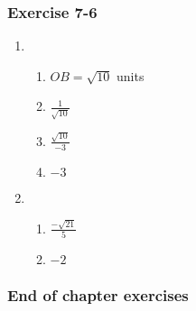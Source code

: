 {\begin{multicols}{3}
\subsubsection*{Exercise 7-6} %
  \begin{enumerate}[noitemsep, label=\textbf{\arabic*}. ]
   \item %
\begin{enumerate}[itemsep=1pt, label=\textbf{(\alph*)} ]
\item $OB=\sqrt{10}$ units%
\item $\frac{1}{\sqrt{10}}$%
\item $\frac{\sqrt{10}}{-3}$%
\item $-3$%
\end{enumerate}


\item %

\begin{enumerate}[itemsep=1pt, label=\textbf{(\alph*)} ]
\item $\frac{-\sqrt{21}}{5}$%
\item $-2$%
\end{enumerate}
\end{enumerate}

\subsubsection*{End of chapter exercises} %


\end{multicols}}
